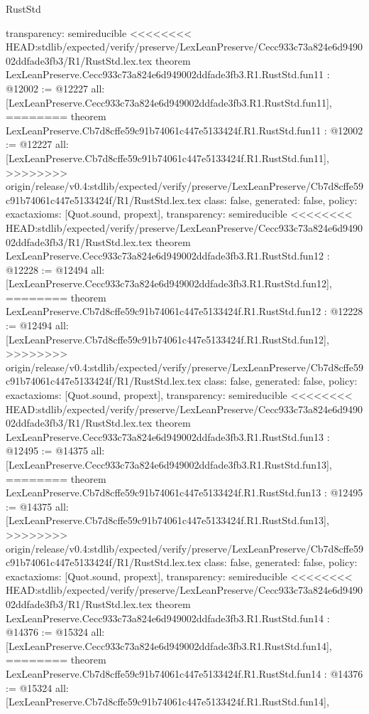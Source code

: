 \begin{lexlean}{RustStd}
\begin{coremodule}
{\begin{coremodule}
{{{{{{{{{{{{{{  transparency: semireducible
}
<<<<<<<< HEAD:stdlib/expected/verify/preserve/LexLeanPreserve/Cecc933c73a824e6d949002ddfade3fb3/R1/RustStd.lex.tex
theorem LexLeanPreserve.Cecc933c73a824e6d949002ddfade3fb3.R1.RustStd.fun11 : @12002 := @12227 {
  all: [LexLeanPreserve.Cecc933c73a824e6d949002ddfade3fb3.R1.RustStd.fun11],
========
theorem LexLeanPreserve.Cb7d8cffe59c91b74061c447e5133424f.R1.RustStd.fun11 : @12002 := @12227 {
  all: [LexLeanPreserve.Cb7d8cffe59c91b74061c447e5133424f.R1.RustStd.fun11],
>>>>>>>> origin/release/v0.4:stdlib/expected/verify/preserve/LexLeanPreserve/Cb7d8cffe59c91b74061c447e5133424f/R1/RustStd.lex.tex
  class: false,
  generated: false,
  policy: exact{axioms: [Quot.sound, propext]},
  transparency: semireducible
}
<<<<<<<< HEAD:stdlib/expected/verify/preserve/LexLeanPreserve/Cecc933c73a824e6d949002ddfade3fb3/R1/RustStd.lex.tex
theorem LexLeanPreserve.Cecc933c73a824e6d949002ddfade3fb3.R1.RustStd.fun12 : @12228 := @12494 {
  all: [LexLeanPreserve.Cecc933c73a824e6d949002ddfade3fb3.R1.RustStd.fun12],
========
theorem LexLeanPreserve.Cb7d8cffe59c91b74061c447e5133424f.R1.RustStd.fun12 : @12228 := @12494 {
  all: [LexLeanPreserve.Cb7d8cffe59c91b74061c447e5133424f.R1.RustStd.fun12],
>>>>>>>> origin/release/v0.4:stdlib/expected/verify/preserve/LexLeanPreserve/Cb7d8cffe59c91b74061c447e5133424f/R1/RustStd.lex.tex
  class: false,
  generated: false,
  policy: exact{axioms: [Quot.sound, propext]},
  transparency: semireducible
}
<<<<<<<< HEAD:stdlib/expected/verify/preserve/LexLeanPreserve/Cecc933c73a824e6d949002ddfade3fb3/R1/RustStd.lex.tex
theorem LexLeanPreserve.Cecc933c73a824e6d949002ddfade3fb3.R1.RustStd.fun13 : @12495 := @14375 {
  all: [LexLeanPreserve.Cecc933c73a824e6d949002ddfade3fb3.R1.RustStd.fun13],
========
theorem LexLeanPreserve.Cb7d8cffe59c91b74061c447e5133424f.R1.RustStd.fun13 : @12495 := @14375 {
  all: [LexLeanPreserve.Cb7d8cffe59c91b74061c447e5133424f.R1.RustStd.fun13],
>>>>>>>> origin/release/v0.4:stdlib/expected/verify/preserve/LexLeanPreserve/Cb7d8cffe59c91b74061c447e5133424f/R1/RustStd.lex.tex
  class: false,
  generated: false,
  policy: exact{axioms: [Quot.sound, propext]},
  transparency: semireducible
}
<<<<<<<< HEAD:stdlib/expected/verify/preserve/LexLeanPreserve/Cecc933c73a824e6d949002ddfade3fb3/R1/RustStd.lex.tex
theorem LexLeanPreserve.Cecc933c73a824e6d949002ddfade3fb3.R1.RustStd.fun14 : @14376 := @15324 {
  all: [LexLeanPreserve.Cecc933c73a824e6d949002ddfade3fb3.R1.RustStd.fun14],
========
theorem LexLeanPreserve.Cb7d8cffe59c91b74061c447e5133424f.R1.RustStd.fun14 : @14376 := @15324 {
  all: [LexLeanPreserve.Cb7d8cffe59c91b74061c447e5133424f.R1.RustStd.fun14],
}}}}}}}}}}}}}}}}}}
\end{coremodule}}
\end{coremodule}
\end{lexlean}
